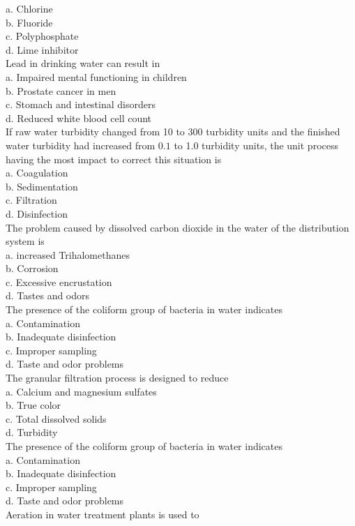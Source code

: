 a. Chlorine\\
b. Fluoride\\
c. Polyphosphate\\
d. Lime inhibitor\\
Lead in drinking water can result in\\
a. Impaired mental functioning in children\\
b. Prostate cancer in men\\
c. Stomach and intestinal disorders\\
d. Reduced white blood cell count\\
  If raw water turbidity changed from 10 to 300 turbidity units and the finished water turbidity had increased from $0.1$ to 1.0 turbidity units, the unit process having the most impact to correct this situation is\\
a. Coagulation\\
b. Sedimentation\\
c. Filtration\\
d. Disinfection\\
The problem caused by dissolved carbon dioxide in the water of the distribution system is\\
a. increased Trihalomethanes\\
b. Corrosion\\
c. Excessive encrustation\\
d. Tastes and odors\\
The presence of the coliform group of bacteria in water indicates\\
a. Contamination\\
b. Inadequate disinfection\\
c. Improper sampling\\
d. Taste and odor problems\\
  The granular filtration process is designed to reduce\\
a. Calcium and magnesium sulfates\\
b. True color\\
c. Total dissolved solids\\
d. Turbidity\\
The presence of the coliform group of bacteria in water indicates\\
a. Contamination\\
b. Inadequate disinfection\\
c. Improper sampling\\
d. Taste and odor problems\\
Aeration in water treatment plants is used to\\
